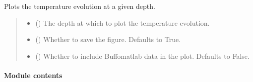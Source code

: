 \documentclass[a4paper,11pt,english,openany]{sphinxmanual}
\begin{document}
\begin{fulllineitems}
\begin{fulllineitems}
\label{\detokenize{api/spyice.postprocess.visualise_model:spyice.postprocess.visualise_model.VisualiseModel.plot_temperature}}
\pysigstartsignatures
{}
\pysigstopsignatures
\sphinxAtStartPar
Plots the temperature evolution at a given depth.
\begin{quote}\begin{description}
\begin{itemize}
\item {} 
\sphinxAtStartPar
{} () \textendash{} The depth at which to plot the temperature evolution.

\item {} 
\sphinxAtStartPar
{} (\sphinxstyleliteralemphasis{\sphinxupquote{, }}) \textendash{} Whether to save the figure. Defaults to True.

\item {} 
\sphinxAtStartPar
{} (\sphinxstyleliteralemphasis{\sphinxupquote{, }}) \textendash{} Whether to include Buffo\sphinxhyphen{}matlab data in the plot. Defaults to False.

\end{itemize}

\end{description}\end{quote}

\end{fulllineitems}


\end{fulllineitems}



\paragraph{Module contents}
\label{\detokenize{api/spyice.postprocess:module-spyice.postprocess}}\label{\detokenize{api/spyice.postprocess:module-contents}}
\sphinxstepscope
\end{document}
